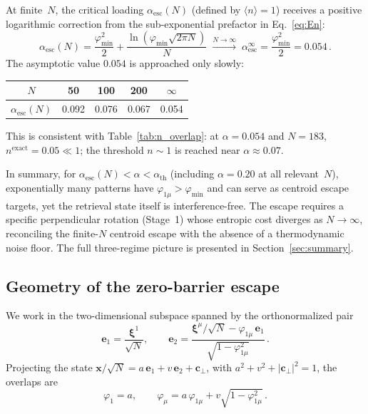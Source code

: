 \documentclass[11pt]{article}
\newcommand{\bxi}{\boldsymbol{\xi}}
\newcommand{\bx}{\mathbf{x}}
\newcommand{\avg}[1]{\langle #1 \rangle}
\begin{document}
At finite~$N$, the critical loading $\alpha_{\mathrm{esc}}(N)$ (defined by $\avg{n} = 1$) receives a positive logarithmic correction from the sub-exponential prefactor in Eq.~\eqref{eq:En}:
\begin{equation}
\alpha_{\mathrm{esc}}(N) = \frac{\varphi_{\min}^2}{2} + \frac{\ln(\varphi_{\min}\sqrt{2\pi N})}{N}
\;\xrightarrow{N\to\infty}\; \alpha_{\mathrm{esc}}^{\infty} = \frac{\varphi_{\min}^2}{2} = 0.054\,.
\label{eq:alpha_c_N}
\end{equation}
The asymptotic value $0.054$ is approached only slowly:
\begin{center}
\begin{tabular}{ccccc}
\toprule
$N$ & 50 & 100 & 200 & $\infty$ \\
\midrule
$\alpha_{\mathrm{esc}}(N)$ & 0.092 & 0.076 & 0.067 & 0.054 \\
\bottomrule
\end{tabular}
\end{center}
This is consistent with Table~\ref{tab:n_overlap}: at $\alpha = 0.054$ and $N = 183$, $n^{\mathrm{exact}} = 0.05 \ll 1$; the threshold $n \sim 1$ is reached near $\alpha \approx 0.07$.

In summary, for $\alpha_{\mathrm{esc}}(N) < \alpha < \alpha_{\mathrm{th}}$ (including $\alpha = 0.20$ at all relevant~$N$), exponentially many patterns have $\varphi_{1\mu} > \varphi_{\min}$ and can serve as centroid escape targets, yet the retrieval state itself is interference-free.  The escape requires a specific perpendicular rotation (Stage~1) whose entropic cost diverges as $N\to\infty$, reconciling the finite-$N$ centroid escape with the absence of a thermodynamic noise floor.  The full three-regime picture is presented in Section~\ref{sec:summary}.

\subsection{Geometry of the zero-barrier escape}

We work in the two-dimensional subspace spanned by the orthonormalized pair
\[
\mathbf{e}_1 = \frac{\bxi^1}{\sqrt{N}}, \qquad
\mathbf{e}_2 = \frac{\bxi^\mu/\sqrt{N} - \varphi_{1\mu}\,\mathbf{e}_1}{\sqrt{1-\varphi_{1\mu}^2}}\,.
\]
Projecting the state $\bx/\sqrt{N} = a\,\mathbf{e}_1 + v\,\mathbf{e}_2 + \mathbf{c}_\perp$, with $a^2 + v^2 + |\mathbf{c}_\perp|^2 = 1$, the overlaps are
\begin{equation}
\varphi_1 = a, \qquad \varphi_\mu = a\,\varphi_{1\mu} + v\sqrt{1-\varphi_{1\mu}^2}\,.
\label{eq:overlaps}
\end{equation}
\end{document}
